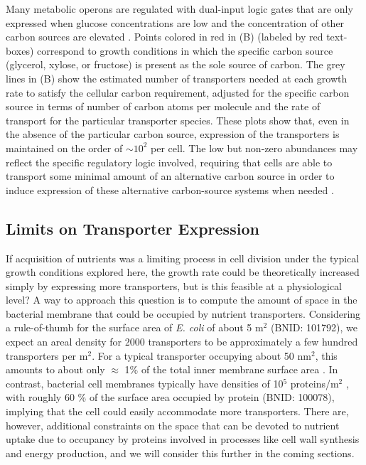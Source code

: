 Many metabolic operons are regulated with dual-input logic gates that are
only expressed when glucose concentrations are low and the concentration of
other carbon sources are elevated \citep{gama-castro2016, zhang2014a,
gama-castro2016, belliveau2018, ireland2020}. Points colored in red in
(B) (labeled by red text-boxes) correspond to growth
conditions in which the specific carbon source (glycerol, xylose, or
fructose) is present as the sole source of carbon. The grey lines in
(B) show the estimated number of transporters needed at
each growth rate to satisfy the cellular carbon requirement, adjusted for the
specific carbon source in terms of number of carbon atoms per molecule and
the rate of transport for the particular transporter species. These plots
show that, even in the absence of the particular carbon source, expression of the
transporters is maintained on the order of $\sim 10^2$ per cell. The low but
non-zero abundances may reflect the specific regulatory logic involved,
requiring that cells are able to transport some minimal amount of an
alternative carbon source in order to induce expression of these alternative
carbon-source systems when needed \citep{laxhuber2020}.

\subsection{Limits on Transporter Expression}
If acquisition of nutrients was a limiting process in cell division under the
typical growth conditions explored here, the growth rate could be theoretically
increased simply by expressing more transporters, but is this feasible at a
physiological level? A way to approach this question is to compute the amount of
space in the bacterial membrane that could be occupied by nutrient transporters.
Considering a rule-of-thumb for the surface area of \textit{E. coli} of about 5
\textmu m$^2$ (BNID: 101792), we expect an areal density for 2000 transporters
to be approximately a few hundred transporters per \textmu m$^2$. For a typical transporter
occupying about 50 nm$^2$, this amounts to about only $\approx$ 1\% of the total
inner membrane surface area \citep{szenk2017}. In contrast, bacterial cell membranes
typically have densities of 10$^5$ proteins/\textmu m$^2$ \citep{phillips2018},
with roughly 60 \% of the surface area occupied by protein (BNID: 100078),
implying that the cell could easily accommodate more transporters. There are,
however, additional constraints on the space that  can be devoted to nutrient
uptake due to occupancy by proteins involved in processes like cell wall
synthesis and energy production, and we will consider this further in the coming
sections.
